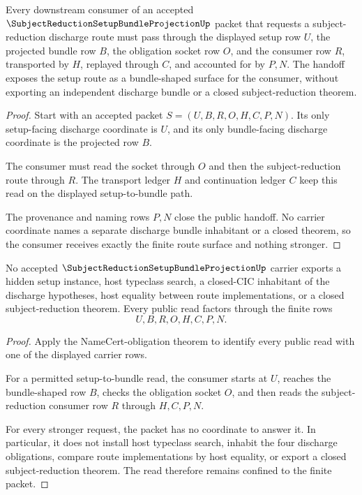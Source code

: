 \begin{theorem}
\label{thm:subject-reduction-setup-bundle-projection-consumer-handoff}
Every downstream consumer of an accepted $\SubjectReductionSetupBundleProjectionUp$ packet that requests a subject-reduction discharge route must pass through the displayed setup row $U$, the projected bundle row $B$, the obligation socket row $O$, and the consumer row $R$, transported by $H$, replayed through $C$, and accounted for by $P,N$. The handoff exposes the setup route as a bundle-shaped surface for the consumer, without exporting an independent discharge bundle or a closed subject-reduction theorem.
\end{theorem}
\begin{proof}
Start with an accepted packet $S=(U,B,R,O,H,C,P,N)$. Its only setup-facing discharge coordinate is $U$, and its only bundle-facing discharge coordinate is the projected row $B$.

The consumer must read the socket through $O$ and then the subject-reduction route through $R$. The transport ledger $H$ and continuation ledger $C$ keep this read on the displayed setup-to-bundle path.

The provenance and naming rows $P,N$ close the public handoff. No carrier coordinate names a separate discharge bundle inhabitant or a closed theorem, so the consumer receives exactly the finite route surface and nothing stronger.
\end{proof}

\begin{theorem}
\label{thm:subject-reduction-setup-bundle-projection-nonescape}
No accepted $\SubjectReductionSetupBundleProjectionUp$ carrier exports a hidden setup instance, host typeclass search, a closed-CIC inhabitant of the discharge hypotheses, host equality between route implementations, or a closed subject-reduction theorem. Every public read factors through the finite rows
$$
U,B,R,O,H,C,P,N.
$$
\end{theorem}
\begin{proof}
Apply the NameCert-obligation theorem to identify every public read with one of the displayed carrier rows.

For a permitted setup-to-bundle read, the consumer starts at $U$, reaches the bundle-shaped row $B$, checks the obligation socket $O$, and then reads the subject-reduction consumer row $R$ through $H,C,P,N$.

For every stronger request, the packet has no coordinate to answer it. In particular, it does not install host typeclass search, inhabit the four discharge obligations, compare route implementations by host equality, or export a closed subject-reduction theorem. The read therefore remains confined to the finite packet.
\end{proof}


